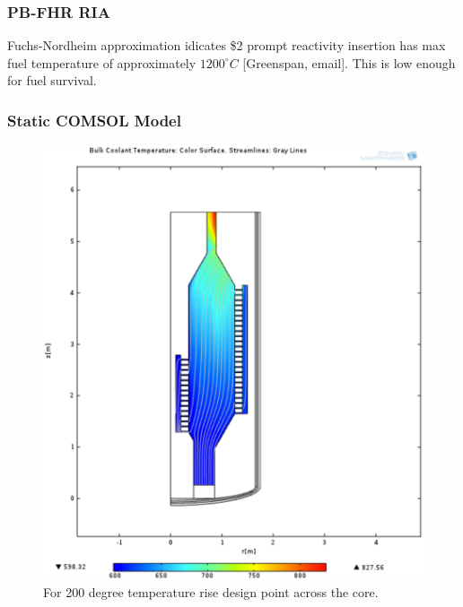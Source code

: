 \begin{frame}[fragile]
  \frametitle{PB-FHR RIA}
  Fuchs-Nordheim approximation idicates \$2 prompt reactivity insertion has max 
  fuel temperature of approximately $1200^{\circ}C$ [Greenspan, email]. This is 
  low enough for fuel survival.
\end{frame}


\begin{frame}[fragile]
  \frametitle{Static COMSOL Model}

  \begin{figure}[htbp!]
    \begin{center}
      \includegraphics[height=0.8\textheight]{./priorart/coolant_temps_200_deg_rise.eps}
    \end{center}
    \caption{For 200 degree temperature rise design point across the core.}
    \label{fig:200degrise}
  \end{figure}
\end{frame}

